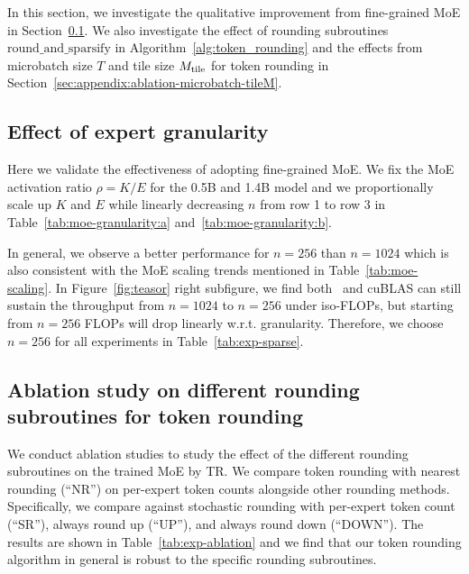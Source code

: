 In this section, we investigate the qualitative improvement from fine-grained MoE in Section~\ref{sec:appendix:granularity}. We also investigate the effect of rounding subroutines $\mathrm{round\_and\_sparsify}$ in Algorithm~\ref{alg:token_rounding} and the effects from microbatch size $T$ and tile size $M_\mathrm{tile}$ for token rounding in Section~\ref{sec:appendix:ablation-microbatch-tileM}.

\subsection{Effect of expert granularity} \label{sec:appendix:granularity}

Here we validate the effectiveness of adopting fine-grained MoE. We fix the MoE activation ratio $\rho=K/E$ for the 0.5B and 1.4B model and we proportionally scale up $K$ and $E$ while linearly decreasing $n$ from row 1 to row 3 in Table~\ref{tab:moe-granularity:a} and~\ref{tab:moe-granularity:b}. 

In general, we observe a better performance for $n=256$ than $n=1024$ which is also consistent with the MoE scaling trends mentioned in Table~\ref{tab:moe-scaling}. %
In Figure~\ref{fig:teasor} right subfigure, we find both \Algname~and cuBLAS can still sustain the throughput from $n=1024$ to $n=256$ under iso-FLOPs, but starting from $n=256$ FLOPs will drop linearly w.r.t. granularity. Therefore, we choose $n=256$ for all experiments in Table~\ref{tab:exp-sparse}.








\subsection{Ablation study on different rounding subroutines for token rounding} \label{sec:appendix:ablation}
We conduct ablation studies to study the effect of the different rounding subroutines on the trained MoE by TR. We compare token rounding with nearest rounding (``NR'') on per-expert token counts alongside other rounding methods. Specifically, we compare against stochastic rounding with per-expert token count (``SR''), always round up (``UP''), and always round down (``DOWN''). The results are shown in Table~\ref{tab:exp-ablation} and we find that our token rounding algorithm in general is robust to the specific rounding subroutines. 

